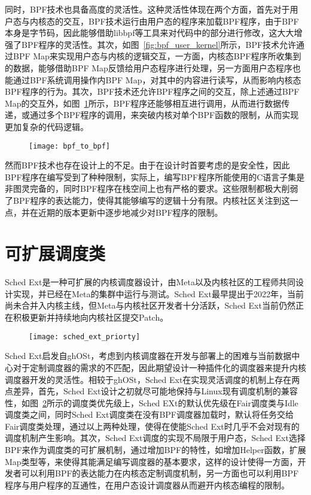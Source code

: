 同时，BPF技术也具备高度的灵活性。这种灵活性体现在两个方面，首先对于用户态与内核态的交互，BPF技术运行由用户态的程序来加载BPF程序，由于BPF本身是字节码，因此能够借助libbpf等工具来对代码中的部分进行修改，这大大增强了BPF程序的灵活性。其次，如图~\ref{fig:bpf_user_kernel}所示，BPF技术允许通过BPF Map来实现用户态与内核的逻辑交互，一方面，内核态BPF程序所收集到的数据，能够借助BPF Map反馈给用户态程序进行处理，另一方面用户态程序也能通过BPF系统调用操作内BPF Map，对其中的内容进行读写，从而影响内核态BPF程序的行为。其次，BPF技术还允许BPF程序之间的交互，除上述通过BPF Map的交互外，如图~\ref{fig:bpf_to_bpf}所示，BPF程序还能够相互进行调用，从而进行数据传递，或通过多个BPF程序的调用，来突破内核对单个BPF函数的限制，从而实现更加复杂的代码逻辑。

\begin{figure}[!htbp]
    \centering
    \texttt{[image: bpf\_to\_bpf]}
    \label{fig:bpf_to_bpf}
\end{figure}

然而BPF技术也存在设计上的不足。由于在设计时首要考虑的是安全性，因此BPF程序在编写受到了种种限制，实际上，编写BPF程序所能使用的C语言子集是非图灵完备的，同时BPF程序在栈空间上也有严格的要求。这些限制都极大削弱了BPF程序的表达能力，使得其能够编写的逻辑十分有限。内核社区关注到这一点，并在近期的版本更新中逐步地减少对BPF程序的限制。

\section{可扩展调度类}

Sched Ext是一种可扩展的内核调度器设计\citep{schedext}，由Meta以及内核社区的工程师共同设计实现，并已经在Meta的集群中运行与测试。Sched Ext最早提出于2022年，当前尚未合并入内核主线，但Meta与内核社区开发者十分活跃，Sched Ext当前仍然正在积极更新并持续地向内核社区提交Patch。

\begin{figure}[!htbp]
    \centering
    \texttt{[image: sched\_ext\_priorty]}
    \label{fig:sched_ext_priorty}
\end{figure}

Sched Ext启发自ghOSt\citep{humphries2021ghost}，考虑到内核调度器在开发与部署上的困难与当前数据中心对于定制调度器的需求的不匹配，因此期望设计一种插件化的调度器来提升内核调度器开发的灵活性。相较于ghOSt，Sched Ext在实现灵活调度的机制上存在两点差异，首先，Sched Ext设计之初就尽可能地保持与Linux现有调度机制的兼容性，如图~\ref{fig:sched_ext_priorty}所示的调度类优先级上，Sched EXt的默认优先级在Fair调度类与Idle调度类之间，同时Sched Ext调度类在没有BPF调度器加载时，默认将任务交给Fair调度类处理，通过以上两种处理，使得在使能Sched Ext时几乎不会对现有的调度机制产生影响。其次，Sched Ext调度的实现不局限于用户态，Sched Ext选择BPF来作为调度类的可扩展机制，通过增加BPF的特性，如增加Helper函数，扩展Map类型等，来使得其能满足编写调度器的基本要求，这样的设计使得一方面，开发者可以利用BPF的表达能力在内核态定制调度机制，另一方面也可以利用BPF程序与用户程序的互通性，在用户态设计调度器从而避开内核态编程的限制。

